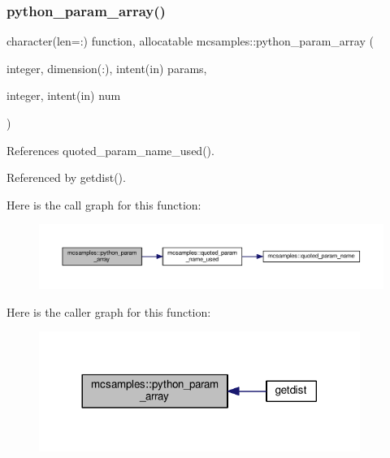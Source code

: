 \subsubsection{\texorpdfstring{python\+\_\+param\+\_\+array()}{python\_param\_array()}}
{\footnotesize\ttfamily character(len=\+:) function, allocatable mcsamples\+::python\+\_\+param\+\_\+array (\begin{DoxyParamCaption}\item[{integer, dimension(\+:), intent(in)}]{params,  }\item[{integer, intent(in)}]{num }\end{DoxyParamCaption})}



References quoted\+\_\+param\+\_\+name\+\_\+used().



Referenced by getdist().

Here is the call graph for this function\+:
\nopagebreak
\begin{figure}[H]
\begin{center}
\leavevmode
\includegraphics[width=350pt]{namespacemcsamples_a61ce07e713757fee14a963684c25fe12_cgraph}
\end{center}
\end{figure}
Here is the caller graph for this function\+:
\nopagebreak
\begin{figure}[H]
\begin{center}
\leavevmode
\includegraphics[width=296pt]{namespacemcsamples_a61ce07e713757fee14a963684c25fe12_icgraph}
\end{center}
\end{figure}
\mbox{\label{namespacemcsamples_a1084f1fea1eddc1385237c666e34115b}} 
